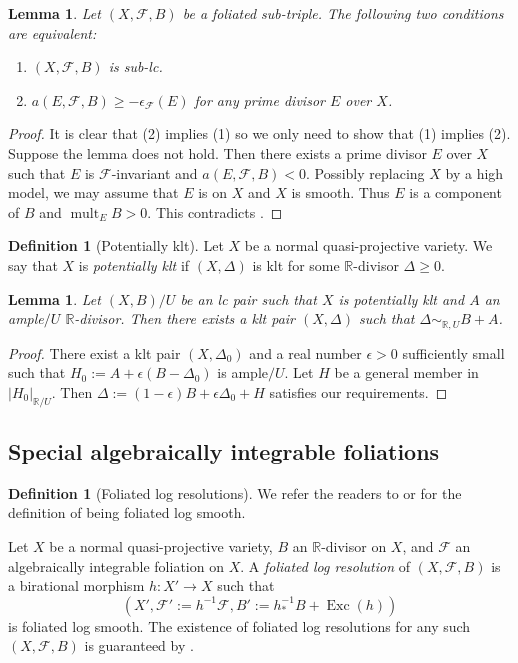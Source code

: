 \documentclass[11pt]{amsart}
\numberwithin{equation}{section}
\newcommand{\Rr}{\mathbb{R}}
\newcommand{\Exc}{\operatorname{Exc}}
\newcommand{\mult}{\operatorname{mult}}
\newcommand{\Ff}{\mathcal{F}}
\newtheorem{lem}[thm]{Lemma}
\theoremstyle{definition}
\newtheorem{defn}[thm]{Definition}
\theoremstyle{definition}
\theoremstyle{definition}
\begin{document}
\begin{lem}\label{lem: equivalence definition lc}
    Let $(X,\Ff,B)$ be a foliated sub-triple. The following two conditions are equivalent:
    \begin{enumerate}
        \item $(X,\Ff,B)$ is sub-lc.
        \item $a(E,\Ff,B)\geq -\epsilon_{\Ff}(E)$ for any prime divisor $E$ over $X$.
    \end{enumerate}
\end{lem}
\begin{proof}
    It is clear that (2) implies (1) so we only need to show that (1) implies (2). Suppose the lemma does not hold. Then there exists a prime divisor $E$ over $X$ such that $E$ is $\Ff$-invariant and $a(E,\Ff,B)<0$. Possibly replacing $X$ by a high model, we may assume that $E$ is on $X$ and $X$ is smooth. Thus $E$ is a component of $B$ and $\mult_EB>0$. This contradicts \cite[Remark 2.3]{CS21}.
\end{proof}

\begin{defn}[Potentially klt]\label{defn: potentially klt}
Let $X$ be a normal quasi-projective variety. We say that $X$ is \emph{potentially klt} if $(X,\Delta)$ is klt for some $\Rr$-divisor $\Delta\geq 0$. 
\end{defn}

\begin{lem}\label{lem: gklt is klt}
    Let $(X,B)/U$ be an lc pair such that $X$ is potentially klt and $A$ an ample$/U$ $\Rr$-divisor. Then there exists a klt pair $(X,\Delta)$ such that $\Delta\sim_{\mathbb R,U}B+A$.
\end{lem}
\begin{proof}
    There exist a klt pair $(X,\Delta_0)$ and a real number $\epsilon>0$ sufficiently small such that $H_0:=A+\epsilon(B-\Delta_0)$ is ample$/U$. Let $H$ be a general member in $|H_0|_{\mathbb R/U}$. Then $\Delta:=(1-\epsilon)B+\epsilon\Delta_0+H$ satisfies our requirements. 
\end{proof}






\subsection{Special algebraically integrable foliations}

\begin{defn}[Foliated log resolutions]\label{defn: log resolution}
We refer the readers to \cite[Definition 6.2.1]{CHLX23} or \cite[3.2. Log canonical foliated pairs]{ACSS21} for the definition of being foliated log smooth. 

Let $X$ be a normal quasi-projective variety, $B$ an $\Rr$-divisor on $X$, and $\Ff$ an algebraically integrable foliation on $X$. A \emph{foliated log resolution} of $(X,\Ff,B)$ is a birational morphism $h: X'\rightarrow X$ such that 
$$(X',\Ff':=h^{-1}\Ff,B':=h^{-1}_*B+\Exc(h))$$ 
is foliated log smooth. The existence of foliated log resolutions for any such $(X,\Ff,B)$ is guaranteed by \cite[Lemma 6.2.4]{CHLX23}.
\end{defn}
\end{document}
